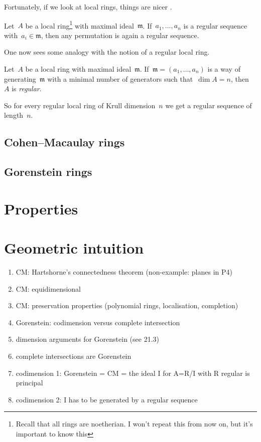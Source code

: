 \documentclass[10pt,a4paper]{article}
\begin{document}
Fortunately, if we look at local rings, things are nicer \cite[corollary 17.2]{eisenbud-commutative-algebra}.
\begin{corollary}
  Let~$A$ be a local ring\footnote{Recall that all rings are noetherian. I won't repeat this from now on, but it's important to know this} with maximal ideal~$\mathfrak{m}$. If~$a_1,\dotsc,a_n$ is a regular sequence with~$a_i\in\mathfrak{m}$, then any permutation is again a regular sequence.
\end{corollary}
One now sees some analogy with the notion of a regular local ring.
\begin{definition}
  Let~$A$ be a local ring with maximal ideal~$\mathfrak{m}$. If~$\mathfrak{m}=(a_1,\dotsc,a_n)$ is a way of generating~$\mathfrak{m}$ with a minimal number of generators such that~$\dim A=n$, then~$A$ is \emph{regular}.
\end{definition}
So for every regular local ring of Krull dimension~$n$ we get a regular sequence of length~$n$.

\subsection{Cohen--Macaulay rings}

\subsection{Gorenstein rings}


\section{Properties}


\section{Geometric intuition}




\begin{enumerate}
  \item CM: Hartshorne's connectedness theorem (non-example: planes in P4)
  \item CM: equidimensional
  \item CM: preservation properties (polynomial rings, localisation, completion)
  \item Gorenstein: codimension versus complete intersection
  \item dimension arguments for Gorenstein (see 21.3)
  \item complete intersections are Gorenstein
  \item codimension 1: Gorenstein = CM = the ideal I for A=R/I with R regular is principal
  \item codimension 2: I has to be generated by a regular sequence
\end{enumerate}

\printbibliography
\end{document}
